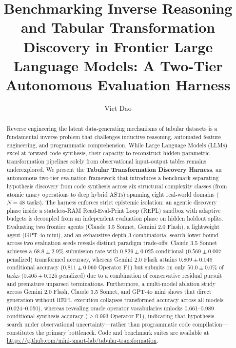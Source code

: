 \documentclass[sigconf]{acmart}
\begin{document}
\title[Benchmarking Inverse Reasoning and Tabular Transformation Discovery in Frontier LLMs]{Benchmarking Inverse Reasoning and Tabular Transformation Discovery in Frontier Large Language Models: A Two-Tier Autonomous Evaluation Harness}

\author{Viet Dao}

\begin{abstract}
Reverse engineering the latent data-generating mechanisms of tabular datasets is a fundamental inverse problem that challenges inductive reasoning, automated feature engineering, and programmatic comprehension. While Large Language Models (LLMs) excel at forward code synthesis, their capacity to reconstruct hidden parametric transformation pipelines solely from observational input-output tables remains underexplored. We present the \textbf{Tabular Transformation Discovery Harness}, an autonomous two-tier evaluation framework that introduces a benchmark separating hypothesis discovery from code synthesis across six structural complexity classes (from atomic unary operations to deep hybrid ASTs) spanning eight real-world domains ($N=48$ tasks). The harness enforces strict epistemic isolation: an agentic discovery phase inside a stateless-RAM Read-Eval-Print Loop (REPL) sandbox with adaptive budgets is decoupled from an independent evaluation phase on hidden holdout splits. Evaluating two frontier agents (Claude 3.5 Sonnet, Gemini 2.0 Flash), a lightweight agent (GPT-4o mini), and an exhaustive depth-3 combinatorial search lower bound across two evaluation seeds reveals distinct paradigm trade-offs: Claude 3.5 Sonnet achieves a $68.8 \pm 2.9\%$ submission rate with $0.829 \pm 0.025$ conditional ($0.569 \pm 0.007$ penalized) transformed accuracy, whereas Gemini 2.0 Flash attains $0.809 \pm 0.049$ conditional accuracy ($0.811 \pm 0.060$ Operator F1) but submits on only $50.0 \pm 0.0\%$ of tasks ($0.405 \pm 0.025$ penalized) due to a combination of conservative residual pursuit and premature unparsed terminations. Furthermore, a multi-model ablation study across Gemini 2.0 Flash, Claude 3.5 Sonnet, and GPT-4o mini shows that direct generation without REPL execution collapses transformed accuracy across all models (0.024--0.050), whereas revealing oracle operator vocabularies unlocks 0.661--0.989 conditional synthesis accuracy ($\ge$0.993 Operator F1), indicating that hypothesis search under observational uncertainty—rather than programmatic code compilation—constitutes the primary bottleneck. Code and benchmark suites are available at \url{https://github.com/mini-smart-lab/tabular-transformation}.
\end{abstract}
\end{document}
